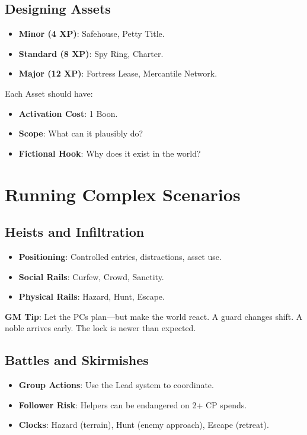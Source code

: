 \subsection*{Designing Assets}

\begin{itemize}
    \item \textbf{Minor (4 XP)}: Safehouse, Petty Title.
    \item \textbf{Standard (8 XP)}: Spy Ring, Charter.
    \item \textbf{Major (12 XP)}: Fortress Lease, Mercantile Network.
\end{itemize}

Each Asset should have:
\begin{itemize}
    \item \textbf{Activation Cost}: 1 Boon.
    \item \textbf{Scope}: What can it plausibly do?
    \item \textbf{Fictional Hook}: Why does it exist in the world?
\end{itemize}

\section*{Running Complex Scenarios}

\subsection*{Heists and Infiltration}

\begin{itemize}
    \item \textbf{Positioning}: Controlled entries, distractions, asset use.
    \item \textbf{Social Rails}: Curfew, Crowd, Sanctity.
    \item \textbf{Physical Rails}: Hazard, Hunt, Escape.
\end{itemize}

\textbf{GM Tip}: Let the PCs plan---but make the world react. A guard changes shift. A noble arrives early. The lock is newer than expected.

\subsection*{Battles and Skirmishes}

\begin{itemize}
    \item \textbf{Group Actions}: Use the Lead system to coordinate.
    \item \textbf{Follower Risk}: Helpers can be endangered on 2+ CP spends.
    \item \textbf{Clocks}: Hazard (terrain), Hunt (enemy approach), Escape (retreat).
\end{itemize}

